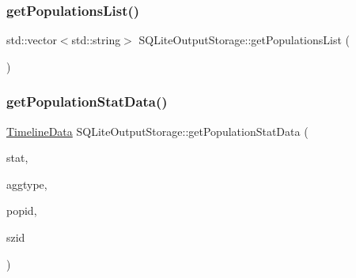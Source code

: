 \mbox{\label{class_s_q_lite_output_storage_a55731ffc5f72f6570900a10728674154}} 
\subsubsection{\texorpdfstring{getPopulationsList()}{getPopulationsList()}}
{\footnotesize\ttfamily std\+::vector$<$std\+::string$>$ S\+Q\+Lite\+Output\+Storage\+::get\+Populations\+List (\begin{DoxyParamCaption}{ }\end{DoxyParamCaption})}

\mbox{\label{class_s_q_lite_output_storage_a6b3820c96847dff0982b7f075312b2d7}} 
\subsubsection{\texorpdfstring{getPopulationStatData()}{getPopulationStatData()}}
{\footnotesize\ttfamily \mbox{\hyperlink{struct_timeline_data}{Timeline\+Data}} S\+Q\+Lite\+Output\+Storage\+::get\+Population\+Stat\+Data (\begin{DoxyParamCaption}\item[{\mbox{\hyperlink{namespacedisplace_1_1plot_a523612c6239ff69acc3e5b7c5b40b618}{displace\+::plot\+::\+Population\+Stat}}}]{stat,  }\item[{\mbox{\hyperlink{namespacedisplace_1_1plot_a522cdc3da3faefae0803944b866e0c3d}{displace\+::plot\+::\+Aggregation\+Type}}}]{aggtype,  }\item[{int}]{popid,  }\item[{std\+::vector$<$ int $>$}]{szid }\end{DoxyParamCaption})}

\mbox{\label{class_s_q_lite_output_storage_ade2be014ca467951f61fd6e11b6bcb85}} 
